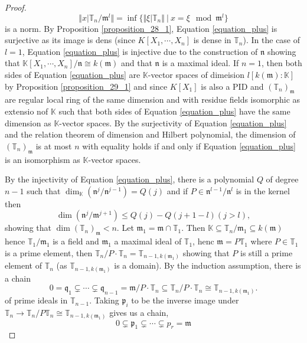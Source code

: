 \documentclass[10pt]{article}
\numberwithin{equation}{section}
\theoremstyle{definition}
\newcommand{\norm}[1]{\Vert #1 \Vert}
\newcommand{\m}[0]{\mathfrak{m}}
\newcommand{\T}[0]{\mathbb{T}}
\newcommand{\K}[0]{\mathbb{K}}
\newcommand{\sep}[0]{\:|\:}
\newcommand{\p}[0]{\mathfrak{p}}
\begin{document}
\begin{proof}
  \begin{equation}
    \norm{x\vert\T_n/\m^l}=\inf\{\norm{\xi\vert\T_n}\sep x=\xi\mod{\m^l}\}
  \end{equation}
  is a norm. By Proposition \ref{proposition_28_1}, Equation \eqref{equation_plus} is surjective as its image is dens (since $K[X_1,\cdots,X_n]$ is dense in $\T_n$). In the case of $l=1$, Equation \eqref{equation_plus} is injective due to the construction of $\mathfrak{n}$ showing that $\K[X_1,\cdots,X_n]/\mathfrak{n}\cong k(\mathfrak{m})$ and that $\mathfrak{n}$ is a maximal ideal. 
  If $n=1$, then both sides of Equation \ref{equation_plus} are $\K$-vector spaces of dimeision $l[k(\m):\K]$ by Proposition \ref{proposition_29_1} and since $K[X_1]$ is also a PID 
  and $(\T_n)_\m$ are regular local ring of the same dimension and with residue fields isomorphic as extensio nof $\K$ such that both sides of Equation \eqref{equation_plus} have the same dimension as $\K$-vector spaces. By the surjectivity of Equation \eqref{equation_plus} and the relation theorem of dimension and Hilbert polynomial, the dimension of $(\T_n)_\m$ is at most $n$ with equality holds if and only if Equation \eqref{equation_plus} is an isomorphism as $\K$-vector spaces.
  \par By the injectivity of Equation \eqref{equation_plus}, there is a polynomial $Q$ of degree $n-1$ such that $\dim_\K(\mathfrak{n}^j/\mathfrak{n}^{j-1})=Q(j)$ and if $P\in \mathfrak{n}^{l-1}/\mathfrak{n}^l$ is in the kernel then 
  \begin{equation*}
    \dim(\mathfrak{n}^j/\mathfrak{m}^{j+1})\leq Q(j) - Q(j+1-l) (j>l),
  \end{equation*}
  showing that $\dim(\T_n)_\m<n$. Let $\mathfrak{m}_1=\m\cap\T_1$. Then $\K\subseteq\T_n/\m_1\subseteq k(\m)$ hence $\T_1/\m_1$ is a field and $\m_1$ a maximal ideal of $\T_1$, henc $\m=P\T_1$ where $P\in\T_1$ is a prime element, then $\T_n/P\cdot\T_n=\T_{n-1,k(\m_1)}$ showing that $P$ is still a prime element of $\T_n$ (as $\T_{n-1,k(\m_1)}$ is a domain). By the induction assumption, there is a chain 
  \begin{equation*}
    0=\mathfrak{q}_1\subsetneq \cdots\subsetneq \mathfrak{q}_{n-1} = \m/P\cdot\T_n\subseteq\T_n/P\cdot\T_n\cong\T_{n-1,k(\m_1)}.
  \end{equation*}
  of prime ideals in $\T_{n-1}$. Taking $\p_i$ to be the inverse image under $\T_n\to\T_n/P\T_n\cong \T_{n-1,k(\m_1)}$ gives us a chain,
  \begin{equation*}
    0\subsetneq \p_1\subsetneq\cdots\subsetneq  p_r=\m 

\end{equation*}
\end{proof}
\end{document}
